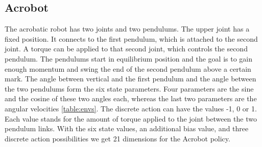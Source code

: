 
\subsection{Acrobot}



The acrobatic robot has two joints and two pendulums. The upper joint has a fixed position. It connects to the first pendulum, which is attached to the second joint. A torque can be applied to that second joint, which controls the second pendulum. The pendulums start in equilibrium position and the goal is to gain enough momentum and swing the end of the second pendulum above a certain mark. The angle between vertical and the first pendulum and the angle between the two pendulums form the six state parameters. Four parameters are the sine and the cosine of these two angles each, whereas the last two parameters are the angular velocities \ref{table:envs}. The discrete action can have the values -1, 0 or 1. Each value stands for the amount of torque applied to the joint between the two pendulum links. With the six state values, an additional bias value, and three discrete action possibilities we get 21 dimensions for the Acrobot policy.

